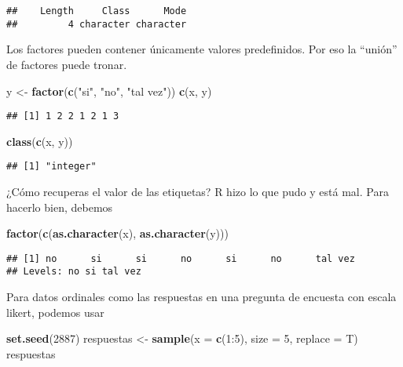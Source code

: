 \documentclass[]{article}
\newenvironment{Shaded}{\begin{snugshade}}{\end{snugshade}}
\newcommand{\KeywordTok}[1]{\textcolor[rgb]{0.13,0.29,0.53}{\textbf{{#1}}}}
\newcommand{\DataTypeTok}[1]{\textcolor[rgb]{0.13,0.29,0.53}{{#1}}}
\newcommand{\DecValTok}[1]{\textcolor[rgb]{0.00,0.00,0.81}{{#1}}}
\newcommand{\StringTok}[1]{\textcolor[rgb]{0.31,0.60,0.02}{{#1}}}
\newcommand{\NormalTok}[1]{{#1}}
\begin{document}
\begin{verbatim}
##    Length     Class      Mode 
##         4 character character
\end{verbatim}

Los factores pueden contener únicamente valores predefinidos. Por eso la
``unión'' de factores puede tronar.

\begin{Shaded}
\begin{Highlighting}[]
\NormalTok{y <-}\StringTok{ }\KeywordTok{factor}\NormalTok{(}\KeywordTok{c}\NormalTok{(}\StringTok{"si"}\NormalTok{, }\StringTok{"no"}\NormalTok{, }\StringTok{"tal vez"}\NormalTok{))}
\KeywordTok{c}\NormalTok{(x, y)}
\end{Highlighting}
\end{Shaded}

\begin{verbatim}
## [1] 1 2 2 1 2 1 3
\end{verbatim}

\begin{Shaded}
\begin{Highlighting}[]
\KeywordTok{class}\NormalTok{(}\KeywordTok{c}\NormalTok{(x, y))}
\end{Highlighting}
\end{Shaded}

\begin{verbatim}
## [1] "integer"
\end{verbatim}

¿Cómo recuperas el valor de las etiquetas? R hizo lo que pudo y está
mal. Para hacerlo bien, debemos

\begin{Shaded}
\begin{Highlighting}[]
\KeywordTok{factor}\NormalTok{(}\KeywordTok{c}\NormalTok{(}\KeywordTok{as.character}\NormalTok{(x), }\KeywordTok{as.character}\NormalTok{(y)))}
\end{Highlighting}
\end{Shaded}

\begin{verbatim}
## [1] no      si      si      no      si      no      tal vez
## Levels: no si tal vez
\end{verbatim}

Para datos ordinales como las respuestas en una pregunta de encuesta con
escala likert, podemos usar

\begin{Shaded}
\begin{Highlighting}[]
\KeywordTok{set.seed}\NormalTok{(}\DecValTok{2887}\NormalTok{)}
\NormalTok{respuestas <-}\StringTok{ }\KeywordTok{sample}\NormalTok{(}\DataTypeTok{x =} \KeywordTok{c}\NormalTok{(}\DecValTok{1}\NormalTok{:}\DecValTok{5}\NormalTok{), }\DataTypeTok{size =} \DecValTok{5}\NormalTok{, }\DataTypeTok{replace =}  \NormalTok{T)}
\NormalTok{respuestas }
\end{Highlighting}
\end{Shaded}
\end{document}
